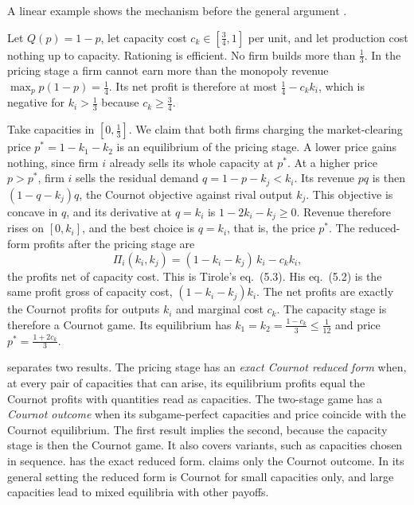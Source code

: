 A linear example shows the mechanism before the general argument \citep[sec.~5.3.2.1]{Tirole1988}.

\begin{example}\label{ex:02-ks-linear}
Let $Q(p) = 1 - p$, let capacity cost $c_k \in \left[\frac{3}{4}, 1\right]$ per unit, and let production cost nothing
up to capacity. Rationing is efficient. No firm builds more than $\frac{1}{3}$. In the pricing stage a firm cannot
earn more than the monopoly revenue $\max_p p(1 - p) = \frac{1}{4}$. Its net profit is therefore at most
$\frac{1}{4} - c_kk_i$, which is negative for $k_i > \frac{1}{3}$ because $c_k \ge \frac{3}{4}$.

Take capacities in $\left[0, \frac{1}{3}\right]$. We claim that both firms charging the market-clearing price
$p^* = 1 - k_1 - k_2$ is an equilibrium of the pricing stage. A lower price gains nothing, since firm $i$ already
sells its whole capacity at $p^*$. At a higher price $p > p^*$, firm $i$ sells the residual demand
$q = 1 - p - k_j < k_i$. Its revenue $pq$ is then $(1 - q - k_j)q$, the Cournot objective against rival output
$k_j$. This objective is concave in $q$, and its derivative at $q = k_i$ is $1 - 2k_i - k_j \ge 0$. Revenue therefore
rises on $[0, k_i]$, and the best choice is $q = k_i$, that is, the price $p^*$. The reduced-form profits after the
pricing stage are
\begin{equation}\label{eq:02-ks-linear}
  \Pi_i(k_i, k_j) = (1 - k_i - k_j)\,k_i - c_k k_i ,
\end{equation}
the profits net of capacity cost. This is Tirole's eq.~(5.3). His eq.~(5.2) is the same profit gross of capacity
cost, $(1 - k_i - k_j)k_i$. The net profits are exactly the Cournot profits for outputs $k_i$ and marginal cost
$c_k$. The capacity stage is therefore a Cournot game. Its equilibrium has $k_1 = k_2 = \frac{1 - c_k}{3} \le
\frac{1}{12}$ and price $p^* = \frac{1 + 2c_k}{3}$.
\end{example}

 \citet[sec.~5.3.4]{Tirole1988} separates two results. The pricing stage has
an \emph{exact Cournot reduced form} when, at every pair of capacities that can arise, its equilibrium profits equal
the Cournot profits with quantities read as capacities. The two-stage game has a \emph{Cournot outcome} when its
subgame-perfect capacities and price coincide with the Cournot equilibrium. The first result implies the second,
because the capacity stage is then the Cournot game. It also covers variants, such as capacities chosen in sequence.
 has the exact reduced form.  claims only the Cournot outcome. In its general
setting the reduced form is Cournot for small capacities only, and large capacities lead to mixed equilibria with
other payoffs.

